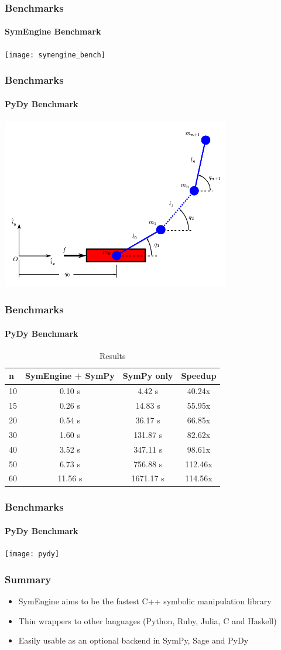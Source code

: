 \documentclass{beamer}
\begin{document}
\begin{frame}
\frametitle{Benchmarks}
\framesubtitle{SymEngine Benchmark}
\texttt{[image: symengine\_bench]}
\end{frame}


\begin{frame}
\frametitle{Benchmarks}
\framesubtitle{PyDy Benchmark}
\includegraphics[width=10cm]{n-pendulum-with-cart}
\end{frame}


\begin{frame}
\frametitle{Benchmarks}
\framesubtitle{PyDy Benchmark}
\begin{table}
\begin{tabular}{l | c | c | c  }
n & SymEngine + SymPy & SymPy only & Speedup\\
\hline \hline
10 & 0.10 s & 4.42 s & 40.24x \\
15 & 0.26 s & 14.83 s & 55.95x \\
20 & 0.54 s & 36.17 s & 66.85x \\
30 & 1.60 s & 131.87 s & 82.62x \\
40 & 3.52 s & 347.11 s & 98.61x \\
50 & 6.73 s & 756.88 s & 112.46x \\
60 & 11.56 s & 1671.17 s & 114.56x
\end{tabular}
\caption{Results}
\end{table}
\end{frame}


\begin{frame}
\frametitle{Benchmarks}
\framesubtitle{PyDy Benchmark}
\texttt{[image: pydy]}
\end{frame}


\begin{frame}
\frametitle{Summary}
\begin{itemize}
 \item SymEngine aims to be the fastest C++ symbolic manipulation library
 \item Thin wrappers to other languages (Python, Ruby, Julia, C and Haskell)
 \item Easily usable as an optional backend in SymPy, Sage and PyDy
\end{itemize}
\end{frame}
\end{document}

